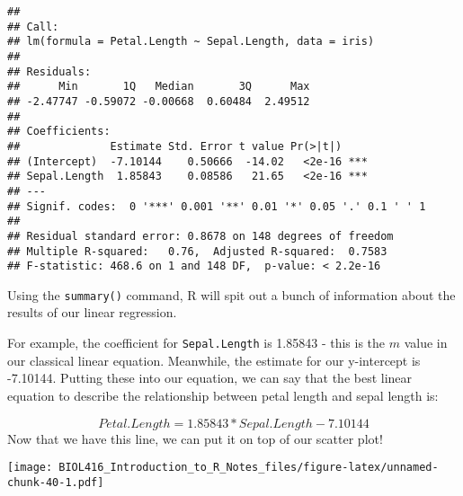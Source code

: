 \documentclass[]{article}
\newenvironment{Shaded}{\begin{snugshade}}{\end{snugshade}}
\newcommand{\KeywordTok}[1]{\textcolor[rgb]{0.13,0.29,0.53}{\textbf{#1}}}
\newcommand{\DataTypeTok}[1]{\textcolor[rgb]{0.13,0.29,0.53}{#1}}
\newcommand{\DecValTok}[1]{\textcolor[rgb]{0.00,0.00,0.81}{#1}}
\newcommand{\FloatTok}[1]{\textcolor[rgb]{0.00,0.00,0.81}{#1}}
\newcommand{\StringTok}[1]{\textcolor[rgb]{0.31,0.60,0.02}{#1}}
\newcommand{\CommentTok}[1]{\textcolor[rgb]{0.56,0.35,0.01}{\textit{#1}}}
\newcommand{\OperatorTok}[1]{\textcolor[rgb]{0.81,0.36,0.00}{\textbf{#1}}}
\newcommand{\NormalTok}[1]{#1}
\begin{document}
\begin{verbatim}
## 
## Call:
## lm(formula = Petal.Length ~ Sepal.Length, data = iris)
## 
## Residuals:
##      Min       1Q   Median       3Q      Max 
## -2.47747 -0.59072 -0.00668  0.60484  2.49512 
## 
## Coefficients:
##              Estimate Std. Error t value Pr(>|t|)    
## (Intercept)  -7.10144    0.50666  -14.02   <2e-16 ***
## Sepal.Length  1.85843    0.08586   21.65   <2e-16 ***
## ---
## Signif. codes:  0 '***' 0.001 '**' 0.01 '*' 0.05 '.' 0.1 ' ' 1
## 
## Residual standard error: 0.8678 on 148 degrees of freedom
## Multiple R-squared:   0.76,  Adjusted R-squared:  0.7583 
## F-statistic: 468.6 on 1 and 148 DF,  p-value: < 2.2e-16
\end{verbatim}

Using the \texttt{summary()} command, R will spit out a bunch of
information about the results of our linear regression.

For example, the coefficient for \texttt{Sepal.Length} is 1.85843 - this
is the \(m\) value in our classical linear equation. Meanwhile, the
estimate for our y-intercept is -7.10144. Putting these into our
equation, we can say that the best linear equation to describe the
relationship between petal length and sepal length is:

\[
Petal.Length = 1.85843*Sepal.Length -7.10144
\] Now that we have this line, we can put it on top of our scatter plot!

\begin{Shaded}
\end{Shaded}

\texttt{[image: BIOL416\_Introduction\_to\_R\_Notes\_files/figure-latex/unnamed-chunk-40-1.pdf]}
\end{document}
